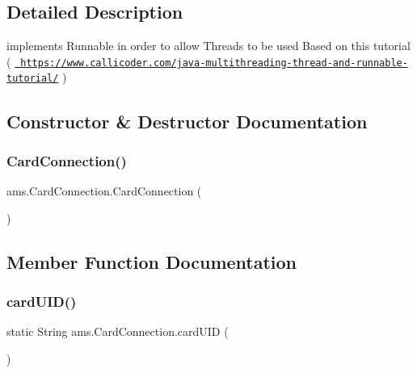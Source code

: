 \subsection{Detailed Description}
implements Runnable in order to allow Threads to be used Based on this tutorial ( \href{https://www.callicoder.com/java-multithreading-thread-and-runnable-tutorial/}{\texttt{ https\+://www.\+callicoder.\+com/java-\/multithreading-\/thread-\/and-\/runnable-\/tutorial/}} ) 

\subsection{Constructor \& Destructor Documentation}
\mbox{\label{classams_1_1_card_connection_afa765cc7c8f61cb08327119713d328f9}} 
\subsubsection{\texorpdfstring{CardConnection()}{CardConnection()}}
{\footnotesize\ttfamily ams.\+Card\+Connection.\+Card\+Connection (\begin{DoxyParamCaption}{ }\end{DoxyParamCaption})}



\subsection{Member Function Documentation}
\mbox{\label{classams_1_1_card_connection_a25b0ff4c7b137be761f2814ef1dcaba7}} 
\subsubsection{\texorpdfstring{cardUID()}{cardUID()}}
{\footnotesize\ttfamily static String ams.\+Card\+Connection.\+card\+U\+ID (\begin{DoxyParamCaption}{ }\end{DoxyParamCaption})\hspace{0.3cm}{\ttfamily [static]}}


